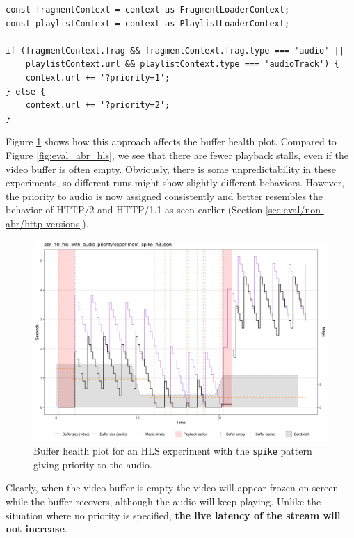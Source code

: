 \begin{verbatim}
const fragmentContext = context as FragmentLoaderContext;
const playlistContext = context as PlaylistLoaderContext;

if (fragmentContext.frag && fragmentContext.frag.type === 'audio' ||
    playlistContext.url && playlistContext.type === 'audioTrack') {
    context.url += '?priority=1';
} else {
    context.url += '?priority=2';
}
\end{verbatim}

Figure \ref{fig:improvements_hls_pri} shows how this approach affects the buffer health plot. Compared to Figure \ref{fig:eval_abr_hls}, we see that there are fewer playback stalls, even if the video buffer is often empty. Obviously, there is some unpredictability in these experiments, so different runs might show slightly different behaviors. However, the priority to audio is now assigned consistently and better resembles the behavior of HTTP/2 and HTTP/1.1 as seen earlier (Section \ref{sec:eval/non-abr/http-versions}).

\begin{figure}[h]
    \centering
    \includegraphics[width=\textwidth]{res/impr_hls_pri.png}
    \caption{Buffer health plot for an HLS experiment with the \texttt{spike} pattern giving priority to the audio.}
    \label{fig:improvements_hls_pri}
\end{figure}

Clearly, when the video buffer is empty the video will appear frozen on screen while the buffer recovers, although the audio will keep playing. Unlike the situation where no priority is specified, \textbf{the live latency of the stream will not increase}.

